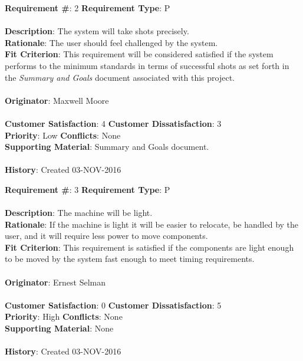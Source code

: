 \documentclass[titlepage]{article}
\begin{document}
\newpage
\begin{framed}
	\noindent\textbf{Requirement \#}: 2 \hfill \textbf{Requirement Type}: P\hfill\\\\
	\noindent\textbf{Description}: The system will take shots precisely.\\
	\textbf{Rationale}: The user should feel challenged by the system.\\
	\textbf{Fit Criterion}: This requirement will be considered satisfied if the system performs to the minimum standards in terms of successful shots as set forth in the \textit{Summary and Goals} document associated with this project.\\\\
	\textbf{Originator}: Maxwell Moore\\\\
	\noindent\textbf{Customer Satisfaction}: 4 \hfill 	\textbf{Customer Dissatisfaction}: 3\hfill\\
	\textbf{Priority}: Low \hfill \textbf{Conflicts}: None \hfill\\
	\textbf{Supporting Material}: Summary and Goals document.\\\\
	\noindent\textbf{History}: Created 03-NOV-2016
\end{framed}

\begin{framed}
	\noindent\textbf{Requirement \#}: 3 \hfill \textbf{Requirement Type}: P \hfill\\\\
	\noindent\textbf{Description}: The machine will be light.\\
	\textbf{Rationale}: If the machine is light it will be easier to relocate, be handled by the user, and it will require less power to move components.\\
	\textbf{Fit Criterion}: This requirement is satisfied if the components are light enough to be moved by the system fast enough to meet timing requirements.\\\\
	\textbf{Originator}: Ernest Selman\\\\
	\noindent\textbf{Customer Satisfaction}: 0 \hfill 	\textbf{Customer Dissatisfaction}: 5 \hfill\\
	\textbf{Priority}: High \hfill \textbf{Conflicts}: None \hfill\\
	\textbf{Supporting Material}: None\\\\
	\noindent\textbf{History}: Created 03-NOV-2016
\end{framed}
\end{document}
